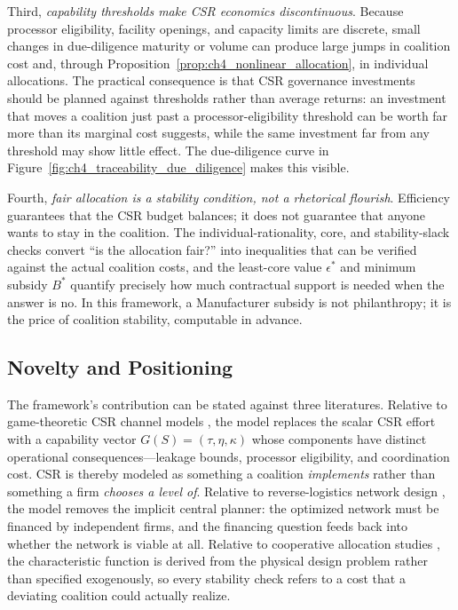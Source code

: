 Third, \emph{capability thresholds make CSR economics discontinuous}. Because processor eligibility, facility openings, and capacity limits are discrete, small changes in due-diligence maturity or volume can produce large jumps in coalition cost and, through Proposition~\ref{prop:ch4_nonlinear_allocation}, in individual allocations. The practical consequence is that CSR governance investments should be planned against thresholds rather than average returns: an investment that moves a coalition just past a processor-eligibility threshold can be worth far more than its marginal cost suggests, while the same investment far from any threshold may show little effect. The due-diligence curve in Figure~\ref{fig:ch4_traceability_due_diligence} makes this visible.

Fourth, \emph{fair allocation is a stability condition, not a rhetorical flourish}. Efficiency guarantees that the CSR budget balances; it does not guarantee that anyone wants to stay in the coalition. The individual-rationality, core, and stability-slack checks convert ``is the allocation fair?'' into inequalities that can be verified against the actual coalition costs, and the least-core value $\epsilon^*$ and minimum subsidy $B^*$ quantify precisely how much contractual support is needed when the answer is no. In this framework, a Manufacturer subsidy is not philanthropy; it is the price of coalition stability, computable in advance.

\subsection{Novelty and Positioning}

The framework's contribution can be stated against three literatures. Relative to game-theoretic CSR channel models \cite{Buccella2024,FantiBuccella2017,Ferrara2017,Khosroshahi2019,Mahdiraji2023}, the model replaces the scalar CSR effort with a capability vector $G(S)=(\tau,\eta,\kappa)$ whose components have distinct operational consequences---leakage bounds, processor eligibility, and coordination cost. CSR is thereby modeled as something a coalition \emph{implements} rather than something a firm \emph{chooses a level of}. Relative to reverse-logistics network design \cite{tadaros2022location,bafadal2024proposed,wang2025planning,ma2024unlocking}, the model removes the implicit central planner: the optimized network must be financed by independent firms, and the financing question feeds back into whether the network is viable at all. Relative to cooperative allocation studies \cite{lozano2013cooperative,wang2023collaborative,meng2023profit,luo2022core}, the characteristic function is derived from the physical design problem rather than specified exogenously, so every stability check refers to a cost that a deviating coalition could actually realize.

